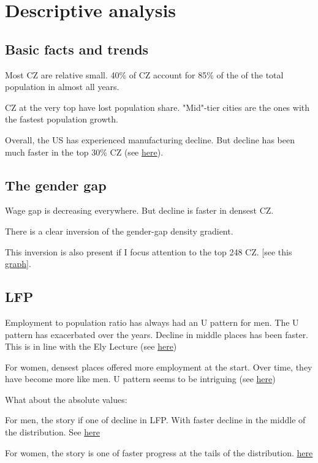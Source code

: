 \section{Descriptive analysis}
\subsection{Basic facts and trends}
\bitem
\item Most CZ are relative small. 40\% of CZ account for 85\% of the of the total population in almost all years.
\item CZ at the very top have lost population share. "Mid"-tier cities are the ones with the fastest population growth.
\item Overall, the US has experienced manufacturing decline. But decline has been much faster in the top 30\% CZ (see \href{https://www.dropbox.com/s/cp9v7uk87lyij4r/bar_deciles_manufacturing.png?dl=0}{here}).
\eitem

\subsection{The gender gap}
\bitem
\item Wage gap is decreasing everywhere. But decline is faster in densest CZ.
\item There is a clear inversion of the gender-gap density gradient. 
\item This inversion is also present if I focus attention to the top 248 CZ. 
[see this \href{https://www.dropbox.com/s/yytq0djtbb8lb5i/bar_graph_deviation_from_mean.png?dl=0}{graph}].

\item
\eitem


\subsection{LFP}
\bitem
	\item Employment to population ratio has always had an U pattern for men. The U pattern has exacerbated over the years. Decline in middle places has been faster. This is in line with the Ely Lecture (see \href{https://www.dropbox.com/s/w0m6oerp6mt7edg/bar_graph_lfp_male.png?dl=0}{here})
	\item For women, densest places offered more employment at the start. Over time, they have become more like men. U pattern seems to be intriguing  (see \href{https://www.dropbox.com/s/mhlqjp6k73i9ub4/bar_graph_lfp_women.png?dl=0}{here})
	\item What about the absolute values:
	\bitem
		\item For men, the story if one of decline in LFP. With faster decline in the middle of the distribution. See \href{https://www.dropbox.com/s/rdhcj6im9xt1ad3/bar_graph_d_lfp_male.png?dl=0}{here}
		\item For women, the story is one of faster progress at the tails of the distribution. \href{https://www.dropbox.com/s/sl9vlat28ongdlb/bar_graph_d_lfp_female.png?dl=0}{here}
	\eitem
\eitem 



